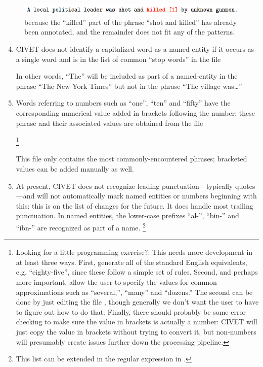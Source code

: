 \documentclass[letterpaper,10pt,english]{sphinxmanual}
\begin{document}
\begin{figure}[htbp]
\centering
\capstart

\includegraphics{annotation2.png}
\caption{because the “killed” part of the phrase “shot and killed” has
already been annotated, and the remainder does not fit any of the
patterns.}\end{figure}
\begin{enumerate}
\setcounter{enumi}{3}
\item {} 
CIVET does not identify a capitalized word as a named-entity if it occurs as a single
word and is in the list of common “stop words” in the file
\begin{quote}

\end{quote}

In other words, “The” will be included as part of a named-entity in the phrase
“The New York Times” but not in the phrase “The village was…”

\item {} 
Words referring to numbers such as “one”, “ten” and “fifty” have the corresponding
numerical value added in brackets following the number; these phrase and their
associated values are obtained from the file

 \footnote{
Looking for a little programming exercise?: This needs more
development in at least three ways. First, generate all of the
standard English equivalents, e.g. “eighty-five”, since these follow
a simple set of rules. Second, and perhaps more important, allow the
user to specify the values for common approximations such as
“several,”, “many” and “dozens.” The second can be done by just
editing the file , though generally we don’t
want the user to have to figure out how to do that. Finally, there
should probably be some error checking to make sure the value in
brackets is actually a number: CIVET will just copy the value in
brackets without trying to convert it, but non-numbers will
presumably create issues further down the processing pipeline.
}

This file only contains the most commonly-encountered phrases; bracketed values can be added manually as well.

\end{enumerate}
\begin{enumerate}
\setcounter{enumi}{4}
\item {} 
At present, CIVET does not recognize leading punctuation—typically
quotes—and will not automatically mark named entities or numbers
beginning with this: this is on the list of changes for the future.
It does handle most trailing punctuation. In named entities, the
lower-case prefixes “al-”, “bin-” and “ibn-” are recognized as
part of a name. \footnote{
This list can be extended in the regular expression  in
.
}

\end{enumerate}
\end{document}

